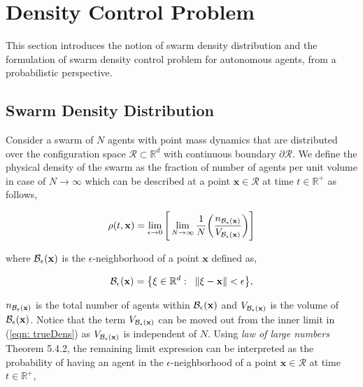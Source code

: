 \documentclass{ifacconf}
\newcommand{\Rconf}{{\mathcal R}}
\newcommand{\bx}{{\bf x}}
\begin{document}
\section{Density Control Problem}\label{Sec: Problem Definition}
This section introduces the notion of swarm density distribution and the formulation of swarm density control problem for autonomous agents, from a  probabilistic  perspective. 

\subsection{Swarm Density Distribution}
Consider a swarm of $N$ agents with point mass dynamics that are distributed over the configuration space $\Rconf \subset \mathbb{R}^d$ with continuous boundary $\partial \Rconf$. We define the physical density of the swarm as the fraction of number of agents per unit volume in case of $N \rightarrow \infty$ which can be described at a point $\textbf{x} \in \Rconf$ at time $t \in \mathbb{R}^+$ as follows,

\begin{equation} \label{eqn: trueDens}
	\rho(t,\bx) = \lim\limits_{\epsilon \rightarrow 0}\Bigg[\lim\limits_{N \rightarrow \infty} \frac{1}{N}\bigg(\frac{{n}_{{\mathcal{B}}_\epsilon(\bx)}}{V_{{\mathcal{B}}_\epsilon(\bx)}} \bigg)\Bigg] 
\end{equation}

where ${\mathcal{B}}_\epsilon(\bx)$ is the $\epsilon$-neighborhood of a point $\textbf{x}$ defined as,

\begin{equation*}
	\mathcal{B}_\epsilon(\bx) = \big\{\xi \in \mathbb{R}^d : \hspace{2mm} \| \xi - \bx\| < \epsilon \big\},
\end{equation*}

${n}_{{\mathcal{B}}_\epsilon(\bx)}$ is the total number of agents within ${\mathcal{B}}_\epsilon(\bx)$ and
$V_{{\mathcal{B}}_\epsilon(\bx)}$ is the volume of ${\mathcal{B}}_\epsilon(\bx)$.
Notice that the term $V_{{\mathcal{B}}_\epsilon(\bx)}$ can be moved out from the inner limit in (\ref{eqn: trueDens}) as $V_{{\mathcal{B}}_\epsilon(\bx)}$ is independent of $N$. Using \emph{law of large numbers} \cite{chung2001course} Theorem 5.4.2, the remaining limit expression can be interpreted as the probability of having an agent in the $\epsilon$-neighborhood of a point $\textbf{x} \in \Rconf$ at time $t \in \mathbb{R}^+$,
\end{document}
